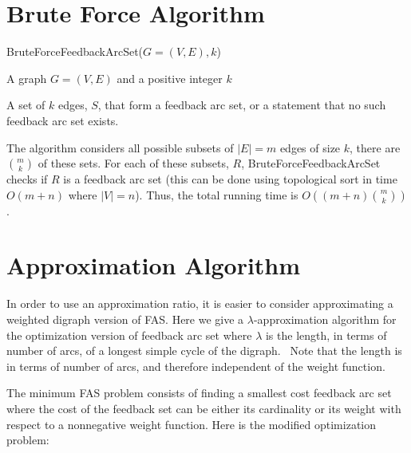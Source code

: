 \documentclass{article}
\begin{document}
\section{Brute Force Algorithm}

 \begin{algorithm}[H]
  \caption*{{\sc BruteForceFeedbackArcSet($G=(V,E),k$)}}
  \begin{algorithmic}[1]
\INPUT A graph $G = (V,E)$ and a positive integer $k$

\OUTPUT A set of $k$ edges, $S$, that form a feedback arc set, or a statement that no such feedback arc set exists.


\EndIf
\EndFor
{}

  
  \end{algorithmic}
  \end{algorithm}
  
The algorithm considers all possible subsets of $|E|=m$ edges of size $k$, there are $m \choose k$ of these sets. For each of these subsets, $R$, {\sc BruteForceFeedbackArcSet} checks if $R$ is a feedback arc set (this can be done using topological sort in time $O(m + n)$ where $|V| = n$). Thus, the total running time is $O((m + n){m\choose k})$. 

\section{Approximation Algorithm}

In order to use an approximation ratio, it is easier to consider approximating a weighted digraph version of FAS. Here we give a $\lambda$-approximation algorithm for the optimization version of feedback arc set where $\lambda$ is the length, in terms of number of arcs, of a longest simple cycle of the digraph.~\cite{demetrescu_combinatorial_2003-1} Note that the length is in terms of number of arcs, and therefore independent of the weight function.

The minimum FAS problem consists of finding a smallest cost feedback arc set where the cost of the feedback set can be either its cardinality or its weight with respect to a nonnegative weight function. Here is the modified optimization problem:

\vspace{.5cm}
\noindent{}
\vspace{.5cm}
\end{document}
